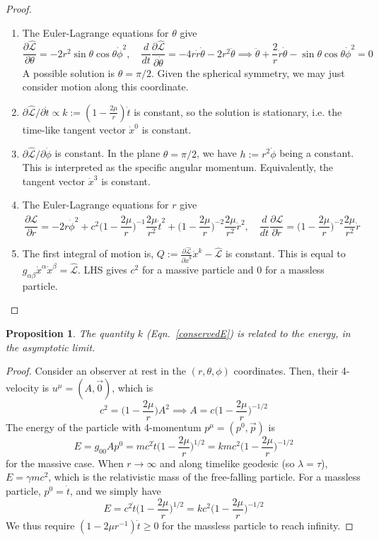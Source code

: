 \documentclass[a4paper]{article}
\theoremstyle{new}
\newtheorem{prop}{Proposition}[section]
\begin{document}
\begin{proof}\leavevmode
\begin{enumerate}
\item The Euler-Lagrange equations for $\theta$ give
$$\frac{\partial\hat{\mathcal{L}}}{\partial\theta}=-2r^2\sin\theta\cos\theta\dot{\phi}^2,\quad\frac{d}{dt}\frac{\partial\hat{\mathcal{L}}}{\partial\dot{\theta}}=-4r\dot{r}\dot{\theta}-2r^2\ddot{\theta}\implies\ddot{\theta}+\frac{2}{r}\dot{r}\dot{\theta}-\sin\theta\cos\theta\dot{\phi}^2=0$$
A possible solution is $\theta=\pi/2$. Given the spherical symmetry, we may just consider motion along this coordinate.
\item $\partial\hat{\mathcal{L}}/\partial\dot{t}\propto k:=(1-\frac{2\mu}{r})\dot{t}$ is constant, so the solution is stationary, i.e. the time-like tangent vector $\dot{x}^0$ is constant.
\item $\partial\hat{\mathcal{L}}/\partial\dot\phi$ is constant. In the plane $\theta=\pi/2$, we have $h:=r^2\dot{\phi}$ being a constant. This is interpreted as the specific angular momentum. Equivalently, the tangent vector $\dot{x}^3$ is constant.
\item The Euler-Lagrange equations for $r$ give
$$\frac{\partial\hat{\mathcal{L}}}{\partial r}=-2r\dot{\phi}^2+c^2\bigg(1-\frac{2\mu}{r}\bigg)^{-1}\frac{2\mu}{r^2}\dot{t}^2+\bigg(1-\frac{2\mu}{r}\bigg)^{-2}\frac{2\mu}{r^2}\dot{r}^2,\quad\frac{d}{dt}\frac{\partial\hat{\mathcal{L}}}{\partial\dot{r}}=\bigg(1-\frac{2\mu}{r}\bigg)^{-2}\frac{2\mu}{r^2}\dot{r}$$
\item The first integral of motion is, $Q:=\frac{\partial\hat{\mathcal{L}}}{\partial\dot{x}^k}\dot{x}^k-\hat{\mathcal{L}}$ is constant. This is equal to $g_{\alpha\beta}\dot{x}^\alpha\dot{x}^\beta=\hat{\mathcal{L}}$. LHS gives $c^2$ for a massive particle and 0 for a massless particle.
\end{enumerate}
\end{proof}
\begin{prop}
The quantity $k$ (Eqn.~\ref{conservedE}) is related to the energy, in the asymptotic limit.
\end{prop}
\begin{proof}
Consider an observer at rest in the $(r,\theta,\phi)$ coordinates. Then, their 4-velocity is $u^\mu=(A,\vec{0})$, which is
$$c^2=\bigg(1-\frac{2\mu}{r}\bigg)A^2\implies A=c\bigg(1-\frac{2\mu}{r}\bigg)^{-1/2}$$
The energy of the particle with 4-momentum $p^\mu=(p^0,\vec{p})$ is
\begin{equation}
E=g_{00}Ap^0=mc^2\dot{t}\bigg(1-\frac{2\mu}{r}\bigg)^{1/2}=kmc^2\bigg(1-\frac{2\mu}{r}\bigg)^{-1/2}\label{energymassive}
\end{equation}
for the massive case. When $r\rightarrow\infty$ and along timelike geodesic (so $\lambda=\tau$), $E=\gamma mc^2$, which is the relativistic mass of the free-falling particle. For a massless particle, $p^0=\dot{t}$, and we simply have
\begin{equation}
E=c^2\dot{t}\bigg(1-\frac{2\mu}{r}\bigg)^{1/2}=kc^2\bigg(1-\frac{2\mu}{r}\bigg)^{-1/2}\label{energymassless}
\end{equation}
We thus require $(1-2\mu r^{-1})\dot{t}\geq0$ for the massless particle to reach infinity.
\end{proof}
\end{document}
